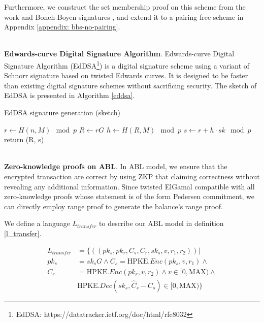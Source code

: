 \documentclass{article}
\begin{document}
Furthermore, we construct the set membership proof on this scheme from the work \cite{camenisch2008efficient} and Boneh-Boyen signatures \cite{jao2009boneh}, and extend it to a pairing free scheme in Appendix \ref{appendix: bbs-no-pairing}.

~\\
\noindent\textbf{Edwards-curve Digital Signature Algorithm}. Edwards-curve Digital Signature Algorithm (EdDSA\footnote{EdDSA: https://datatracker.ietf.org/doc/html/rfc8032}) is a digital signature scheme using a variant of Schnorr signature based on twisted Edwards curves. It is designed to be faster than existing digital signature schemes without sacrificing security. The sketch of EdDSA is presented in Algorithm \ref{eddsa}.

\begin{algorithm}
 \caption{EdDSA signature generation (sketch)}
 \label{eddsa}
 \LinesNumbered
 
 $r \gets H(n, M) \mod{p}$ \;
 $R \gets rG$ \;
 $h \gets H(R, M) \mod{p}$ \;
 $s \gets r + h \cdot sk \mod{p}$ \;
  return (R, s)
\end{algorithm}

~\\
\noindent\textbf{Zero-knowledge proofs on ABL}. In ABL model, we ensure that the encrypted transaction are correct by using ZKP that claiming correctness without revealing any additional information. Since twisted ElGamal compatible with all zero-knowledge proofs whose statement is of the form Pedersen commitment, we can directly employ range proof \cite{10.1007/978-3-662-58820-8_4} to generate the balance's range proof. 

We define a language $L_{transfer}$ to describe our ABL model in definition \ref{l_transfer}.

\begin{equation}\label{l_transfer}
\begin{aligned}
    L_{transfer} &= \{((pk_s, pk_r, C_s, C_r, sk_s, v, r_1, r_2)) | \\ 
        pk_s &= sk_sG \land C_s = \mbox{HPKE}.Enc(pk_s,v, r_1) \land \\
        C_r &=  \mbox{HPKE}.Enc(pk_r,v, r_2) \land v \in [0, \mbox{MAX}) \land \\
        &\mbox{HPKE}.Dec(sk_s, \hat{C}_s - C_s) \in [0, \mbox{MAX})\}
\end{aligned}
\end{equation}
\end{document}
